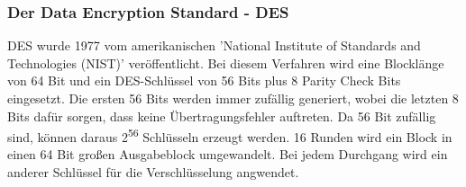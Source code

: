 \documentclass[11pt]{scrartcl}
\begin{document}
\subsubsection{Der Data Encryption Standard - DES}
\label{sec:data-encryotion-standard}
\grqq{}DES wurde 1977 vom amerikanischen 'National Institute of Standards and Technologies (NIST)' veröffentlicht.\grqq{} \cite{1} Bei diesem Verfahren wird eine Blocklänge von 64 Bit und ein DES-Schlüssel von 56 Bits plus 8 \grqq{}Parity Check Bits\grqq{} \cite{1} eingesetzt. Die ersten 56 Bits werden immer zufällig generiert, wobei die letzten 8 Bits dafür sorgen, dass keine Übertragungsfehler auftreten. Da 56 Bit zufällig sind, können daraus 2\textsuperscript{56} Schlüsseln erzeugt werden. 16 Runden wird ein Block in einen 64 Bit großen Ausgabeblock umgewandelt. Bei jedem Durchgang wird ein anderer Schlüssel für die Verschlüsselung angwendet.
\cite{1}\cite{4}
\end{document}

